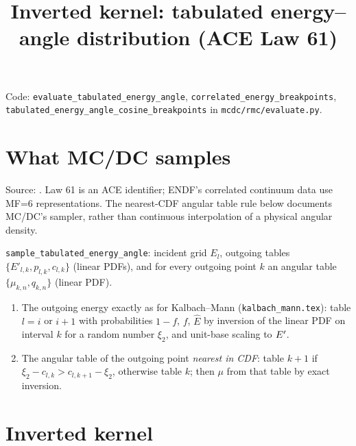 \documentclass[11pt]{article}
\title{Inverted kernel: tabulated energy--angle distribution (ACE Law 61)}
\date{}
\begin{document}
\maketitle

\noindent Code: \texttt{evaluate\_tabulated\_energy\_angle},
\texttt{correlated\_energy\_breakpoints},
\texttt{tabulated\_energy\_angle\_cosine\_breakpoints} in \texttt{mcdc/rmc/evaluate.py}.

\section{What MC/DC samples}

\noindent Source: . Law 61 is an ACE identifier; ENDF's
correlated continuum data use MF=6 representations. The nearest-CDF angular
table rule below documents MC/DC's sampler, rather than continuous interpolation
of a physical angular density.

\texttt{sample\_tabulated\_energy\_angle}: incident grid $E_l$, outgoing tables
$\{E'_{l,k}, p_{l,k}, c_{l,k}\}$ (linear PDFs), and for every outgoing point $k$ an
angular table $\{\mu_{k,n}, q_{k,n}\}$ (linear PDF).
\begin{enumerate}
  \item The outgoing energy exactly as for Kalbach--Mann
  (\texttt{kalbach\_mann.tex}): table $l = i$ or $i+1$ with probabilities $1-f$, $f$,
  $\hat E$ by inversion of the linear PDF on interval $k$ for a random number $\xi_2$,
  and unit-base scaling to $E'$.
  \item The angular table of the outgoing point \emph{nearest in CDF}: table $k+1$ if
  $\xi_2 - c_{l,k} > c_{l,k+1} - \xi_2$, otherwise table $k$; then $\mu$ from that
  table by exact inversion.
\end{enumerate}

\section{Inverted kernel}
\end{document}
